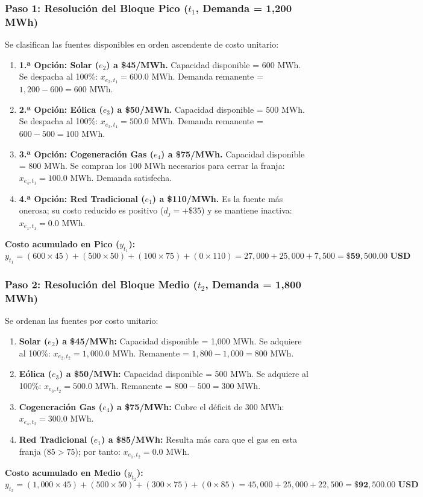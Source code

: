 \documentclass[11pt,a4paper]{article}
\begin{document}
\subsubsection{Paso 1: Resolución del Bloque Pico ($t_1$, Demanda = 1,200 MWh)}
Se clasifican las fuentes disponibles en orden ascendente de costo unitario:
\begin{enumerate}
    \item \textbf{1.ª Opción: Solar ($e_2$) a \$45/MWh.} Capacidad disponible = 600 MWh. Se despacha al 100\%: $x_{e_2, t_1} = 600.0\text{ MWh}$. Demanda remanente = $1,200 - 600 = 600\text{ MWh}$.
    \item \textbf{2.ª Opción: Eólica ($e_3$) a \$50/MWh.} Capacidad disponible = 500 MWh. Se despacha al 100\%: $x_{e_3, t_1} = 500.0\text{ MWh}$. Demanda remanente = $600 - 500 = 100\text{ MWh}$.
    \item \textbf{3.ª Opción: Cogeneración Gas ($e_4$) a \$75/MWh.} Capacidad disponible = 800 MWh. Se compran los 100 MWh necesarios para cerrar la franja: $x_{e_4, t_1} = 100.0\text{ MWh}$. Demanda satisfecha.
    \item \textbf{4.ª Opción: Red Tradicional ($e_1$) a \$110/MWh.} Es la fuente más onerosa; su costo reducido es positivo ($d_j = +\$35$) y se mantiene inactiva: $x_{e_1, t_1} = 0.0\text{ MWh}$.
\end{enumerate}
\textbf{Costo acumulado en Pico ($y_{t_1}$):}
\begin{equation}
y_{t_1} = (600 \times 45) + (500 \times 50) + (100 \times 75) + (0 \times 110) = 27,000 + 25,000 + 7,500 = \mathbf{\$59,500.00\text{ USD}}
\end{equation}

\subsubsection{Paso 2: Resolución del Bloque Medio ($t_2$, Demanda = 1,800 MWh)}
Se ordenan las fuentes por costo unitario:
\begin{enumerate}
    \item \textbf{Solar ($e_2$) a \$45/MWh:} Capacidad disponible = 1,000 MWh. Se adquiere al 100\%: $x_{e_2, t_2} = 1,000.0\text{ MWh}$. Remanente = $1,800 - 1,000 = 800\text{ MWh}$.
    \item \textbf{Eólica ($e_3$) a \$50/MWh:} Capacidad disponible = 500 MWh. Se adquiere al 100\%: $x_{e_3, t_2} = 500.0\text{ MWh}$. Remanente = $800 - 500 = 300\text{ MWh}$.
    \item \textbf{Cogeneración Gas ($e_4$) a \$75/MWh:} Cubre el déficit de 300 MWh: $x_{e_4, t_2} = 300.0\text{ MWh}$.
    \item \textbf{Red Tradicional ($e_1$) a \$85/MWh:} Resulta más cara que el gas en esta franja ($85 > 75$); por tanto: $x_{e_1, t_2} = 0.0\text{ MWh}$.
\end{enumerate}
\textbf{Costo acumulado en Medio ($y_{t_2}$):}
\begin{equation}
y_{t_2} = (1,000 \times 45) + (500 \times 50) + (300 \times 75) + (0 \times 85) = 45,000 + 25,000 + 22,500 = \mathbf{\$92,500.00\text{ USD}}
\end{equation}
\end{document}

